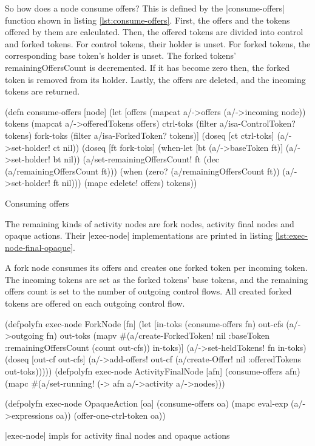 \documentclass[submission]{eptcs}
\newcommand{\code}{\clojureinline}
\begin{document}
So how does a node consume offers?  This is defined by the
\code|consume-offers| function shown in listing \vref{lst:consume-offers}.
First, the offers and the tokens offered by them are calculated.  Then, the
offered tokens are divided into control and forked tokens.  For control tokens,
their holder is unset.  For forked tokens, the corresponding base token's
holder is unset.  The forked tokens' \textsf{remainingOffersCount} is
decremented.  If it has become zero then, the forked token is removed from its
holder.  Lastly, the offers are deleted, and the incoming tokens are returned.

\begin{listing}[h!tb]
\begin{clojurecode}
(defn consume-offers [node]
  (let [offers    (mapcat a/->offers (a/->incoming node))
        tokens    (mapcat a/->offeredTokens offers)
        ctrl-toks (filter a/isa-ControlToken? tokens)
        fork-toks (filter a/isa-ForkedToken? tokens)]
    (doseq [ct ctrl-toks]
      (a/->set-holder! ct nil))
    (doseq [ft fork-toks]
      (when-let [bt (a/->baseToken ft)]
        (a/->set-holder! bt nil))
      (a/set-remainingOffersCount! ft (dec (a/remainingOffersCount ft)))
      (when (zero? (a/remainingOffersCount ft))
        (a/->set-holder! ft nil)))
    (mapc edelete! offers)
    tokens))
\end{clojurecode}
\caption{Consuming offers}
\label{lst:consume-offers}
\end{listing}

The remaining kinds of activity nodes are fork nodes, activity final nodes and
opaque actions.  Their \code|exec-node| implementations are printed in listing
\vref{lst:exec-node-final-opaque}.

A fork node consumes its offers and creates one forked token per incoming
token.  The incoming tokens are set as the forked tokens' base tokens, and the
remaining offers count is set to the number of outgoing control flows.  All
created forked tokens are offered on each outgoing control flow.

\begin{listing}[h!tb]
\begin{clojurecode}
(defpolyfn exec-node ForkNode [fn]
  (let [in-toks  (consume-offers fn)
        out-cfs  (a/->outgoing fn)
        out-toks (mapv #(a/create-ForkedToken!
                         nil {:baseToken %
                              :remainingOffersCount (count out-cfs)})
                       in-toks)]
    (a/->set-heldTokens! fn in-toks)
    (doseq [out-cf out-cfs]
      (a/->add-offers! out-cf (a/create-Offer!
                               nil {:offeredTokens out-toks})))))
(defpolyfn exec-node ActivityFinalNode [afn]
  (consume-offers afn)
  (mapc #(a/set-running! %
        (-> afn a/->activity a/->nodes)))

(defpolyfn exec-node OpaqueAction [oa]
  (consume-offers oa)
  (mapc eval-exp (a/->expressions oa))
  (offer-one-ctrl-token oa))
\end{clojurecode}
\caption{\code|exec-node| impls for activity final nodes and opaque actions}
\label{lst:exec-node-final-opaque}
\end{listing}
\end{document}
